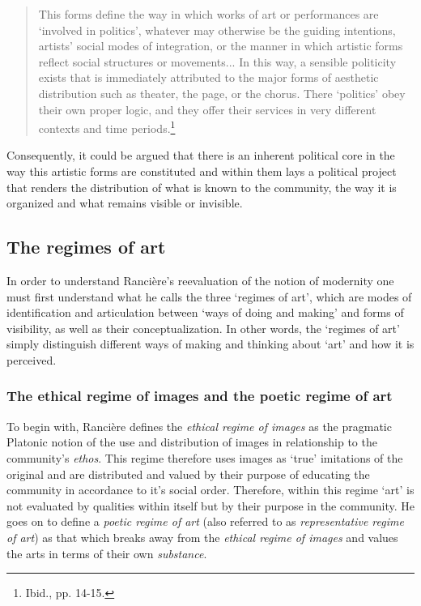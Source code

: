 \begin{quote}
This forms define the way in which works of art or performances are `involved in politics', whatever may otherwise be the guiding intentions, artists' social modes of integration, or the manner in which artistic forms reflect social structures or movements... In this way, a sensible politicity exists that is immediately attributed to the major forms of aesthetic distribution such as theater, the page, or the chorus. There `politics' obey their own proper logic, and they offer their services in very different contexts and time periods.\footnote{Ibid., pp. 14-15.} 
\end{quote}
Consequently, it could be argued that there is an inherent political core in the way this artistic forms are constituted and within them lays a political project that renders the distribution of what is known to the community, the way it is organized and what remains visible or invisible.    

\subsection{The regimes of art}

In order to understand Ranci\`{e}re's reevaluation of the notion of modernity one must first understand what he calls the three `regimes of art', which are modes of identification and articulation between `ways of doing and making' and forms of visibility, as well as their conceptualization. In other words, the `regimes of art' simply distinguish different ways of making and thinking about `art' and how it is perceived.

\subsubsection{The ethical regime of images and the poetic regime of art}

To begin with, Ranci\`{e}re defines the \emph{ethical regime of images} as the pragmatic Platonic notion of the use and distribution of images in relationship to the community's \emph{ethos}. This regime therefore uses images as `true' imitations of the original and are distributed and valued by their purpose of educating the community in accordance to it's social order. Therefore, within this regime `art' is not evaluated by qualities within itself but by their purpose in the community. He goes on to define a \emph{poetic regime of art} (also referred to as \emph{representative regime of art}) as that which breaks away from the \emph{ethical regime of images} and values the arts in terms of their own \emph{substance}.

